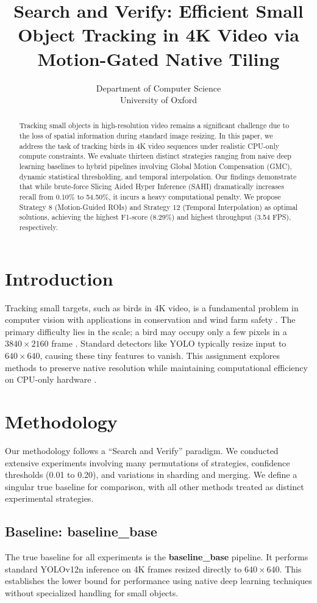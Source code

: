 \documentclass{article}
\title{\textbf{Search and Verify: Efficient Small Object Tracking in 4K Video via
Motion-Gated Native Tiling}}
\author{
  \normalsize Department of Computer Science\\
  \normalsize University of Oxford
}
\date{}
\begin{document}
\maketitle

\begin{abstract}
  Tracking small objects in high-resolution video remains a significant challenge due to
  the loss of spatial
  information during standard image resizing. In this paper, we address the task of
  tracking birds in 4K
  video sequences under realistic CPU-only compute constraints. We evaluate thirteen
  distinct strategies
  ranging from naive deep learning baselines to hybrid pipelines involving Global Motion
  Compensation (GMC),
  dynamic statistical thresholding, and temporal interpolation. Our findings demonstrate that while
  brute-force Slicing Aided Hyper Inference (SAHI) dramatically increases recall from
  0.10\% to 54.50\%, it
  incurs a heavy computational penalty. We propose Strategy 8 (Motion-Guided ROIs) and
  Strategy 12 (Temporal
  Interpolation) as optimal solutions, achieving the highest F1-score (8.29\%) and
  highest throughput (3.54
  FPS), respectively.
\end{abstract}

\section{Introduction}
Tracking small targets, such as birds in 4K video, is a fundamental problem in computer vision with
applications in conservation and wind farm safety \cite{mva2025smot4sb}. The primary
difficulty lies in the
scale; a bird may occupy only a few pixels in a $3840 \times 2160$ frame
\cite{mva2025smot4sb}. Standard
detectors like YOLO typically resize input to $640 \times 640$, causing these tiny
features to vanish. This
assignment explores methods to preserve native resolution while maintaining computational
efficiency on
CPU-only hardware \cite{clark2025vis}.

\section{Methodology}
Our methodology follows a ``Search and Verify'' paradigm. We conducted extensive
experiments involving many
permutations of strategies, confidence thresholds (0.01 to 0.20), and variations in
sharding and merging. We
define a singular true baseline for comparison, with all other methods treated as
distinct experimental strategies.

\subsection{Baseline: baseline\_base}
The true baseline for all experiments is the \textbf{baseline\_base} pipeline. It
performs standard YOLOv12n
inference on 4K frames resized directly to $640 \times 640$. This establishes the lower
bound for performance
using native deep learning techniques without specialized handling for small objects.
\end{document}
